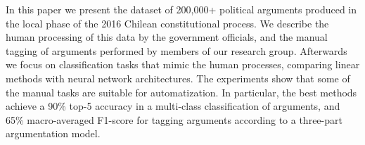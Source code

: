 In this paper we present the dataset of 200,000+ political arguments produced in the local phase of the 2016 Chilean constitutional process. We describe the human processing of this data by the government officials, and the manual tagging of arguments performed by members of our research group. Afterwards we focus on classification tasks that mimic the human processes, comparing linear methods with neural network architectures. The experiments show that some of the manual tasks are suitable for automatization. In particular, the best methods achieve a 90\% top-5 accuracy in a multi-class classification of arguments, and 65\% macro-averaged F1-score for tagging arguments according to a three-part argumentation model.
